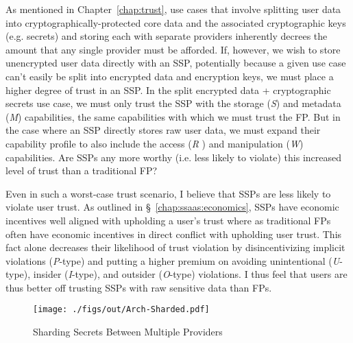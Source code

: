 As mentioned in Chapter~\ref{chap:trust}, use cases that involve
splitting user data into cryptographically-protected core data and the
associated cryptographic keys (e.g. secrets) and storing each with
separate providers inherently decrees the amount that any single
provider must be afforded. If, however, we wish to store unencrypted
user data directly with an SSP, potentially because a given use case
can't easily be split into encrypted data and encryption keys, we must
place a higher degree of trust in an SSP. In the split encrypted data
+ cryptographic secrets use case, we must only trust the SSP with the
storage (\emph{S}) and metadata (\emph{M}) capabilities, the same
capabilities with which we must trust the FP. But in the case where an
SSP directly stores raw user data, we must expand their capability
profile to also include the access (\emph{R} ) and manipulation
(\emph{W}) capabilities. Are SSPs any more worthy (i.e. less likely to
violate) this increased level of trust than a traditional FP?

Even in such a worst-case trust scenario, I believe that SSPs are less
likely to violate user trust. As outlined in
\S~\ref{chap:ssaas:economics}, SSPs have economic incentives well
aligned with upholding a user's trust where as traditional FPs often
have economic incentives in direct conflict with upholding user
trust. This fact alone decreases their likelihood of trust violation
by disincentivizing implicit violations (\emph{P}-type) and putting a
higher premium on avoiding unintentional (\emph{U}-type), insider
(\emph{I}-type), and outsider (\emph{O}-type) violations. I thus feel
that users are thus better off trusting SSPs with raw sensitive data
than FPs.

\begin{figure}[t]
  \centering
  \texttt{[image: ./figs/out/Arch-Sharded.pdf]}
  \caption{Sharding Secrets Between Multiple Providers}
  \label{fig:ssaas-sharded}
\end{figure}

